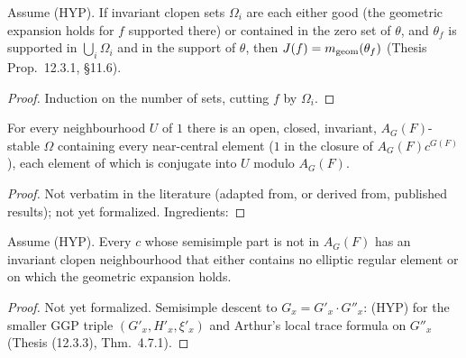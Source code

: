 \begin{proposition}
\label{geomAt_glue}
\leanok
{}
Assume (HYP). If invariant clopen sets $\Omega_i$ are each either good (the geometric expansion holds for $f$
supported there) or contained in the zero set of $\theta$, and $\theta_f$ is supported in $\bigcup_i\Omega_i$ and
in the support of $\theta$, then $J(f)=m_{\mathrm{geom}}(\theta_f)$ (Thesis Prop.~12.3.1, \cite{BP} \S11.6).
\end{proposition}
\begin{proof}
\leanok
{}
Induction on the number of sets, cutting $f$ by $\Omega_i$.
\end{proof}

\begin{theorem}
\label{hc_exists_invariantClopen_nearCentral}
\leanok
{}
For every neighbourhood $U$ of $1$ there is an open, closed, invariant, $A_G(F)$-stable $\Omega$ containing every
near-central element ($1$ in the closure of $A_G(F)c^{G(F)}$), each element of which is conjugate into $U$
modulo $A_G(F)$.
\end{theorem}
\begin{proof}
Not verbatim in the literature (adapted from, or derived from, published results); not yet formalized. Ingredients: 
\end{proof}

\begin{lemma}
\label{exists_good_nhd_of_not_nearCentral}
\leanok
{}
Assume (HYP). Every $c$ whose semisimple part is not in $A_G(F)$ has an invariant clopen neighbourhood that
either contains no elliptic regular element or on which the geometric expansion holds.
\end{lemma}
\begin{proof}
Not yet formalized. Semisimple descent to $G_x=G'_x\cdot G''_x$: (HYP) for the smaller GGP triple
$(G'_x,H'_x,\xi'_x)$ and Arthur's local trace formula on $G''_x$ (Thesis (12.3.3), Thm.~4.7.1).
\end{proof}


